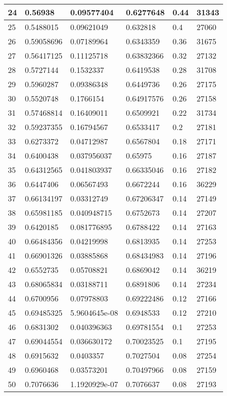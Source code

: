 \begin{longtable}{|l|l|l|l|l|l|}
24 & 0.56938 & 0.09577404 & 0.6277648 & 0.44 & 31343 \\ \hline 
25 & 0.5488015 & 0.09621049 & 0.632818 & 0.4 & 27060 \\ \hline 
26 & 0.59058696 & 0.07189964 & 0.6343359 & 0.36 & 31675 \\ \hline 
27 & 0.56417125 & 0.11125718 & 0.63832366 & 0.32 & 27132 \\ \hline 
28 & 0.5727144 & 0.1532337 & 0.6419538 & 0.28 & 31708 \\ \hline 
29 & 0.5960287 & 0.09386348 & 0.6449736 & 0.26 & 27175 \\ \hline 
30 & 0.5520748 & 0.1766154 & 0.64917576 & 0.26 & 27158 \\ \hline 
31 & 0.57468814 & 0.16409011 & 0.6509921 & 0.22 & 31734 \\ \hline 
32 & 0.59237355 & 0.16794567 & 0.6533417 & 0.2 & 27181 \\ \hline 
33 & 0.6273372 & 0.04712987 & 0.6567804 & 0.18 & 27171 \\ \hline 
34 & 0.6400438 & 0.037956037 & 0.65975 & 0.16 & 27187 \\ \hline 
35 & 0.64312565 & 0.041803937 & 0.66335046 & 0.16 & 27182 \\ \hline 
36 & 0.6447406 & 0.06567493 & 0.6672244 & 0.16 & 36229 \\ \hline 
37 & 0.66134197 & 0.03312749 & 0.67206347 & 0.14 & 27149 \\ \hline 
38 & 0.65981185 & 0.040948715 & 0.6752673 & 0.14 & 27207 \\ \hline 
39 & 0.6420185 & 0.081776895 & 0.6788422 & 0.14 & 27163 \\ \hline 
40 & 0.66484356 & 0.04219998 & 0.6813935 & 0.14 & 27253 \\ \hline 
41 & 0.66901326 & 0.03885868 & 0.68434983 & 0.14 & 27196 \\ \hline 
42 & 0.6552735 & 0.05708821 & 0.6869042 & 0.14 & 36219 \\ \hline 
43 & 0.68065834 & 0.03188711 & 0.6891806 & 0.14 & 27234 \\ \hline 
44 & 0.6700956 & 0.07978803 & 0.69222486 & 0.12 & 27166 \\ \hline 
45 & 0.69485325 & 5.9604645e-08 & 0.6948533 & 0.12 & 27210 \\ \hline 
46 & 0.6831302 & 0.040396363 & 0.69781554 & 0.1 & 27253 \\ \hline 
47 & 0.69044554 & 0.036630172 & 0.70023525 & 0.1 & 27195 \\ \hline 
48 & 0.6915632 & 0.0403357 & 0.7027504 & 0.08 & 27254 \\ \hline 
49 & 0.6960468 & 0.03573201 & 0.70497966 & 0.08 & 27159 \\ \hline 
50 & 0.7076636 & 1.1920929e-07 & 0.7076637 & 0.08 & 27193 \\ \hline 
\end{longtable}